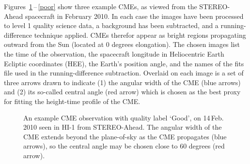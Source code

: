 \documentclass[10pt, a4paper, oneside]{article}
\begin{document}
Figures~\ref{good}\,--\,\ref{poor} show three example CMEs, as viewed from the STEREO-Ahead spacecraft in February 2010. In each case the images have been processed to level 1 quality science data, a background has been subtracted, and a running-difference technique applied. CMEs therefor appear as bright regions propagating outward from the Sun (located at 0 degrees elongation). The chosen images list the time of the observation, the spacecraft longitude in Heliocentric Earth Ecliptic coordinates (HEE), the Earth's position angle, and the names of the fits file used in the running-difference subtraction. Overlaid on each image is a set of three arrows drawn to indicate (1) the angular width of the CME (blue arrows) and (2) its so-called central angle (red arrow) which is chosen as the best proxy for fitting the height-time profile of the CME.

\begin{figure}[ht]
\caption{An example CME observation with quality label `Good', on 14\,Feb.\,2010 seen in HI-1 from STEREO-Ahead. The angular width of the CME extends beyond the plane-of-sky as the CME propagates (blue arrows), so the central angle may be chosen close to 60 degrees (red arrow).}
\label{good}
\end{figure}
\end{document}
